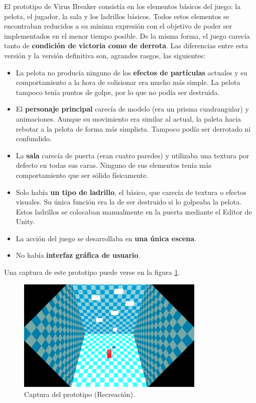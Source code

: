 El prototipo de Virus Breaker consistía en los elementos básicos del juego: la pelota, el jugador, la sala y los ladrillos básicos. Todos estos elementos se encontraban reducidos a su mínima expresión con el objetivo de poder ser implementados en el menor tiempo posible. De la misma forma, el juego carecía tanto de \textbf{condición de victoria como de derrota}. Las diferencias entre esta versión y la versión definitiva son, agrandes rasgos, las siguientes:
\begin{itemize}
\item La pelota no producía ninguno de los \textbf{efectos de partículas} actuales y su comportamiento a la hora de colisionar era mucho más simple. La pelota tampoco tenía puntos de golpe, por lo que no podía ser destruida.
\item El \textbf{personaje principal} carecía de modelo (era un prisma cuadrangular) y animaciones. Aunque su movimiento era similar al actual, la paleta hacia rebotar a la pelota de forma más simplista. Tampoco podía ser derrotado ni confundido.
\item La \textbf{sala} carecía de puerta (eran cuatro paredes) y utilizaba una textura por defecto en todas sus caras. Ninguno de sus elementos tenía más comportamiento que ser sólido físicamente.
\item Solo había \textbf{un tipo de ladrillo}, el básico, que carecía de textura o efectos visuales. Su única función era la de ser destruido si lo golpeaba la pelota. Estos ladrillos se colocaban manualmente en la puerta mediante el Editor de Unity.
\item La acción del juego se desarrollaba en \textbf{una única escena}.
\item No había \textbf{interfaz gráfica de usuario}.
\end{itemize} 
Una captura de este prototipo puede verse en la figura \ref{captura_prototipo}.
\begin{figure}[h]
    \centering
    \includegraphics[width=0.8\textwidth]{images/resultados/desarrollo/prototipo}
    \caption{Captura del prototipo (Recreación).}
    \label{captura_prototipo}
\end{figure}

